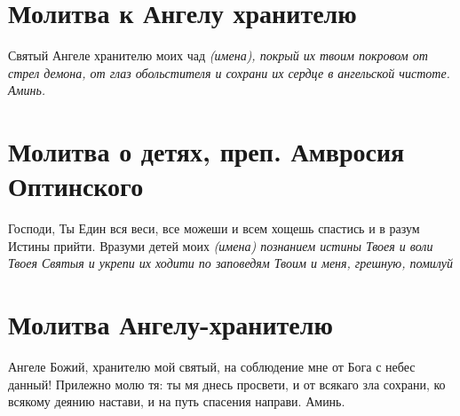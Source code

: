\section{Молитва к Ангелу хранителю}\begin{mymulticols}






Святый Ангеле хранителю моих чад \itshape (имена)\normalfont{}, покрый их твоим покровом от стрел демона, от глаз обольстителя и сохрани их сердце в ангельской чистоте. Аминь.





\end{mymulticols}

\section{Молитва о детях, преп. Амвросия Оптинского}\begin{mymulticols}



Господи, Ты Един вся веси, все можеши и всем хощешь спастись и в разум Истины прийти. Вразуми детей моих \itshape (имена)\normalfont{} познанием истины Твоея и воли Твоея Святыя и укрепи их ходити по заповедям Твоим и меня, грешную, помилуй


\end{mymulticols}

\section{Молитва Ангелу-хранителю}\begin{mymulticols}



Ангеле Божий, хранителю мой святый, на соблюдение мне от Бога с небес данный! Прилежно молю тя: ты мя днесь просвети, и от всякаго зла сохрани, ко всякому деянию настави, и на путь спасения направи. Аминь.


\end{mymulticols}

